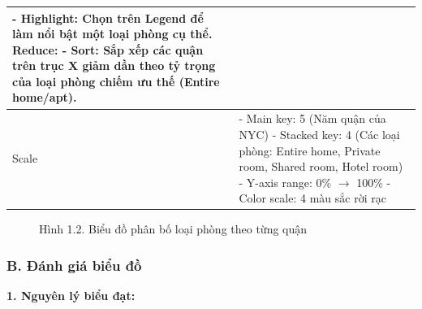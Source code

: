 \begin{longtable}{|p{2.8cm}|p{11.5cm}|}
\newline
- Highlight: Chọn trên Legend để làm nổi bật một loại phòng cụ thể. \newline
\newline
\textbf{Reduce:} \newline
\newline
- Sort: Sắp xếp các quận trên trục X giảm dần theo tỷ trọng của loại phòng chiếm ưu thế (Entire home/apt). \\
\hline
Scale & - Main key: 5 (Năm quận của NYC) \newline
\newline
- Stacked key: 4 (Các loại phòng: Entire home, Private room, Shared room, Hotel room) \newline
\newline
- Y-axis range: 0\% $\rightarrow$ 100\% \newline
\newline
- Color scale: 4 màu sắc rời rạc \\
\hline
\end{longtable}

\begin{figure}[H]
    \centering
    \caption{Hình 1.2. Biểu đồ phân bố loại phòng theo từng quận}
    \label{fig:domain-task1-chart2}
\end{figure}

\subsubsection*{B. Đánh giá biểu đồ}

\textbf{1. Nguyên lý biểu đạt:}

